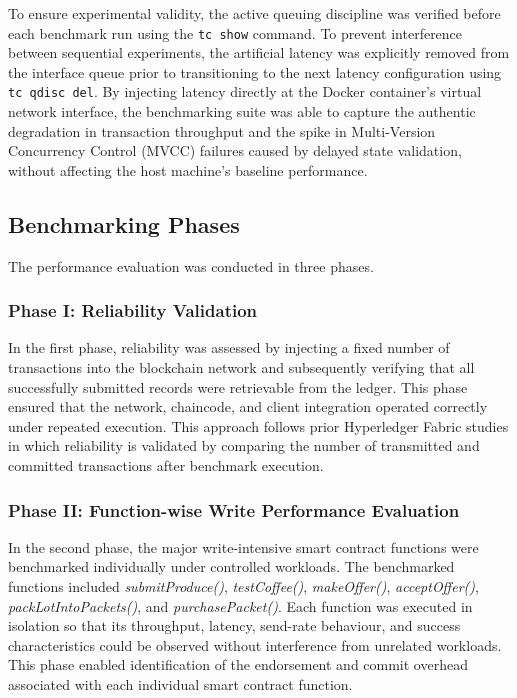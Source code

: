 \documentclass[12pt]{article}
\begin{document}
	To ensure experimental validity, the active queuing discipline was verified before each benchmark run using the \texttt{tc show} command. To prevent interference between sequential experiments, the artificial latency was explicitly removed from the interface queue prior to transitioning to the next latency configuration using \texttt{tc qdisc del}. By injecting latency directly at the Docker container's virtual network interface, the benchmarking suite was able to capture the authentic degradation in transaction throughput and the spike in Multi-Version Concurrency Control (MVCC) failures caused by delayed state validation, without affecting the host machine's baseline performance.
	
	\subsection{Benchmarking Phases}
	
	The performance evaluation was conducted in three phases.
	
	\subsubsection{Phase I: Reliability Validation}
	
	In the first phase, reliability was assessed by injecting a fixed number of transactions into the blockchain network and subsequently verifying that all successfully submitted records were retrievable from the ledger. This phase ensured that the network, chaincode, and client integration operated correctly under repeated execution. This approach follows prior Hyperledger Fabric studies in which reliability is validated by comparing the number of transmitted and committed transactions after benchmark execution. 
	
	\subsubsection{Phase II: Function-wise Write Performance Evaluation}
	
	In the second phase, the major write-intensive smart contract functions were benchmarked individually under controlled workloads. The benchmarked functions included \textit{submitProduce()}, \textit{testCoffee()}, \textit{makeOffer()}, \textit{acceptOffer()}, \textit{packLotIntoPackets()}, and \textit{purchasePacket()}. Each function was executed in isolation so that its throughput, latency, send-rate behaviour, and success characteristics could be observed without interference from unrelated workloads. This phase enabled identification of the endorsement and commit overhead associated with each individual smart contract function.
	
\end{document}

